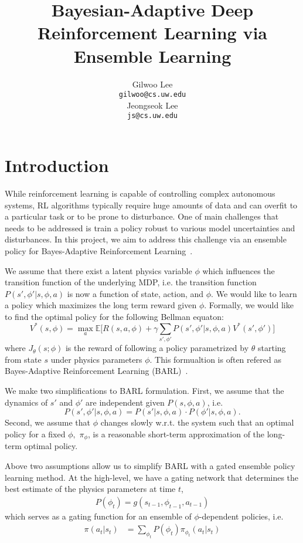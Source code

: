 \documentclass{article}
\title{Bayesian-Adaptive Deep Reinforcement Learning via Ensemble Learning}
\author{Gilwoo Lee \\
  \texttt{gilwoo@cs.uw.edu} \\
  \And
  Jeongseok Lee \\
  \texttt{js@cs.uw.edu}
}
\begin{document}

\maketitle

\section{Introduction}
While reinforcement learning is capable of controlling complex autonomous systems, RL algorithms typically require huge amounts of data and can overfit to a particular task or to be prone to disturbance. One of main challenges that needs to be addressed is train a policy robust to various model uncertainties and disturbances. In this project, we aim to address this challenge via an ensemble policy for Bayes-Adaptive Reinforcement Learning~\cite{ghavamzadeh2015bayesian}.

We assume that there exist a latent physics variable $\phi$ which influences the transition function of the underlying MDP, i.e. the transition function  $P(s',\phi' |s, \phi, a)$ is now a function of state, action, and $\phi$. We would like to learn a policy which maximizes the long term reward given $\phi$. Formally, we would like to find the optimal policy for the following Bellman equaton:
\begin{equation}\label{eq:rl}
V^*(s, \phi) = \max_a \mathbb{E} \bigg[R(s, a, \phi) + \gamma \sum_{s', \phi'}P(s',\phi'|s, \phi, a)V^*(s', \phi') \bigg]
\end{equation}
where $J_\theta(s; \phi)$ is the reward of following a policy parametrized by $\theta$ starting from state $s$ under physics parameters $\phi$. This formualtion is often refered as Bayes-Adaptive Reinforcement Learning (BARL)~\cite{ghavamzadeh2015bayesian}.

We make two simplifications to BARL formulation. First, we assume that the dynamics of $s'$ and $\phi'$ are independent given $P(s, \phi, a)$, i.e.
\begin{equation*}
P(s',\phi'|s, \phi, a) = P(s'|s, \phi, a)\cdot P(\phi'|s, \phi, a).
\end{equation*}
Second, we assume that $\phi$ changes slowly w.r.t. the system such that an optimal policy for a fixed $\phi,$
$\pi_{\phi}$, is a reasonable short-term approximation of the long-term optimal policy.

Above two assumptions allow us to simplify BARL with a gated ensemble policy learning method. At the high-level, we have a gating network that determines the best estimate of the physics parameters at time $t$,
\begin{align*}
P(\phi_t) = g(s_{t-1}, \phi_{t-1}, a_{t-1})
\end{align*}
which serves as a gating function for an ensemble of $\phi$-dependent policies, i.e.
\begin{align*}
\pi(a_t | s_t) &= \sum_{\phi_t} P(\phi_t) \pi_{\phi_t}(a_t | s_t)
\end{align*}
\end{document}
